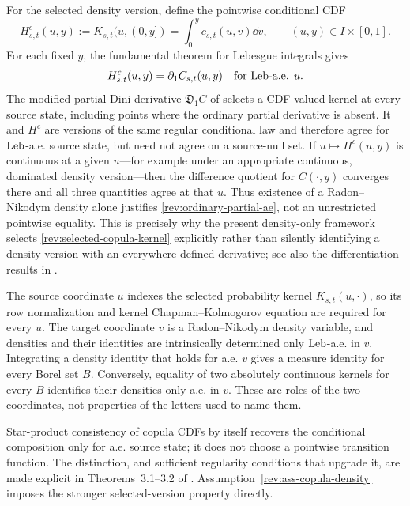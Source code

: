 \begin{remark}
\label{rev:rem-modified-Dini}
For the selected density version, define the pointwise conditional CDF
\begin{equation}
H_{s,t}^{c}(u,y):=K_{s,t}(u,(0,y])
=\int_0^yc_{s,t}(u,v)\dd v,
\qquad (u,y)\in I\times[0,1].
\label{rev:selected-conditional-CDF}
\end{equation}
For each fixed $y$, the fundamental theorem for Lebesgue integrals gives
\begin{equation}
H_{s,t}^{c}(u,y)=\partial_1C_{s,t}(u,y)
\quad\text{for $\operatorname{Leb}$-a.e. }u.
\label{rev:ordinary-partial-ae}
\end{equation}
The modified partial Dini derivative $\mathfrak D_1C$ of
\citet[Definition~2.1 and Theorems~2.1--2.2]{FangJiangLiuYang2020} selects a
CDF-valued kernel at every source state, including points where the ordinary
partial derivative is absent.  It and $H^c$ are versions of the same regular
conditional law and therefore agree for $\operatorname{Leb}$-a.e. source state, but need not
agree on a source-null set.  If $u\mapsto H^c(u,y)$ is continuous at a given
$u$---for example under an appropriate continuous, dominated density
version---then the difference quotient for $C(\cdot,y)$ converges there and
all three quantities agree at that $u$.  Thus existence of a Radon--Nikodym
density alone justifies \eqref{rev:ordinary-partial-ae}, not an unrestricted
pointwise equality.  This is precisely why the present density-only framework
selects \eqref{rev:selected-copula-kernel} explicitly rather than silently
identifying a density version with an everywhere-defined derivative; see also
the differentiation results in \citet[Chapter~3]{Folland1999}.
\end{remark}

\begin{remark}
\label{rev:rem-quantifier-convention}
The source coordinate $u$ indexes the selected probability kernel
$K_{s,t}(u,\cdot)$, so its row normalization and kernel
Chapman--Kolmogorov equation are required for every $u$.  The target coordinate
$v$ is a Radon--Nikodym density variable, and densities and their identities are
intrinsically determined only $\operatorname{Leb}$-a.e. in $v$.  Integrating a density
identity that holds for a.e. $v$ gives a measure identity for every Borel set
$B$.  Conversely, equality of two absolutely continuous kernels for every
$B$ identifies their densities only a.e. in $v$.  These are roles of the two
coordinates, not properties of the letters used to name them.

Star-product consistency of copula CDFs by itself recovers the conditional
composition only for a.e. source state; it does not choose a pointwise
transition function.  The distinction, and sufficient regularity conditions
that upgrade it, are made explicit in Theorems~3.1--3.2 of
\citet{FangJiangLiuYang2020}.  Assumption~\ref{rev:ass-copula-density} imposes
the stronger selected-version property directly.
\end{remark}

